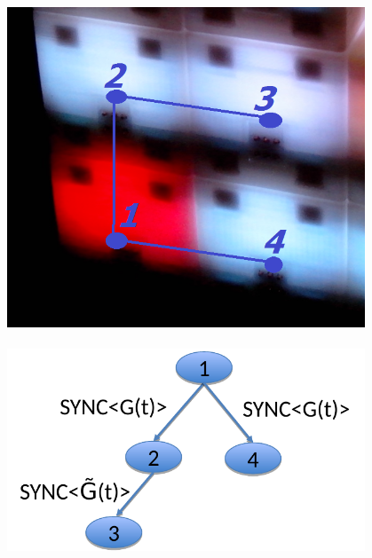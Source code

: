 \begin{frame}
\begin{center}
\begin{columns}[t]
\begin{column}{.80\textwidth}
      \end{column}
      \begin{column}{.20\textwidth}
		\begin{figure}
			\centering
			\hspace{-1cm}
			\includegraphics[width=1.25\linewidth]{fig/synchronization/sub-system}\\~\\
			\vspace*{-0.25cm}
			\hspace*{-3cm}
			\includegraphics[width=2.3\linewidth]{fig/synchronization/tree}
			\label{fig:sub-system}
		\end{figure}
      \end{column}
  \end{columns}
  \end{center}
\end{frame}

